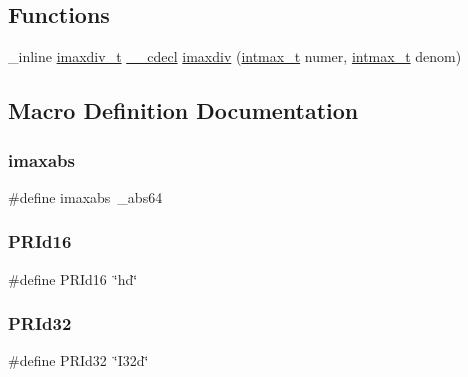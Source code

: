 \subsection*{Functions}
\begin{DoxyCompactItemize}
\item 
\+\_\+inline \hyperlink{a00702}{imaxdiv\+\_\+t} \hyperlink{a00843_a238347d7669f8f1e9c83bfe63a2730c4}{\+\_\+\+\_\+cdecl} \hyperlink{a00113_a8cb1de760b0fde0bae9eb5e070f0bce7}{imaxdiv} (\hyperlink{a00119_a036cd61bb4b30bb510b9538af4cebd1d}{intmax\+\_\+t} numer, \hyperlink{a00119_a036cd61bb4b30bb510b9538af4cebd1d}{intmax\+\_\+t} denom)
\end{DoxyCompactItemize}


\subsection{Macro Definition Documentation}
\mbox{\label{a00113_ae79e51adb5d28d1b1119d29ed234334e}} 
\subsubsection{\texorpdfstring{imaxabs}{imaxabs}}
{\footnotesize\ttfamily \#define imaxabs~\+\_\+abs64}

\mbox{\label{a00113_a087e50fe0283aacc71d7138d13e91939}} 
\subsubsection{\texorpdfstring{P\+R\+Id16}{PRId16}}
{\footnotesize\ttfamily \#define P\+R\+Id16~\char`\"{}hd\char`\"{}}

\mbox{\label{a00113_a6d94d1417e1b35c53aee6306590de72b}} 
\subsubsection{\texorpdfstring{P\+R\+Id32}{PRId32}}
{\footnotesize\ttfamily \#define P\+R\+Id32~\char`\"{}I32d\char`\"{}}

